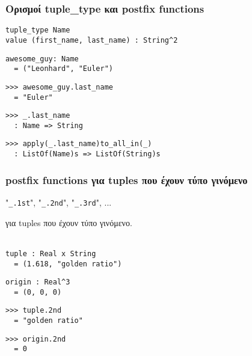 \documentclass{beamer}
\def\e{\foreignlanguage{english}}
\begin{document}
\begin{frame}[fragile]

\frametitle{Ορισμοί \e{tuple\_type} και \e{postfix functions}}

\begin{otherlanguage}{english}
\begin{verbatim}
tuple_type Name
value (first_name, last_name) : String^2
\end{verbatim}
\begin{verbatim}
awesome_guy: Name
  = ("Leonhard", "Euler")
\end{verbatim}
\pause
\begin{verbatim}
>>> awesome_guy.last_name
  = "Euler"
\end{verbatim}
\pause
\begin{verbatim}
>>> _.last_name
  : Name => String
\end{verbatim}
\pause
\begin{verbatim}
>>> apply(_.last_name)to_all_in(_)
  : ListOf(Name)s => ListOf(String)s
\end{verbatim}
\end{otherlanguage}

\end{frame}

\begin{frame}[fragile]

\frametitle{\e{postfix functions} για \e{tuples} που έχουν τύπο γινόμενο}

\begin{otherlanguage}{english}
"\verb|_.1st|", "\verb|_.2nd|", "\verb|_.3rd|", ...
\end{otherlanguage}
για \e{tuples} που έχουν τύπο γινόμενο.
\\~\

\pause
\begin{otherlanguage}{english}
\begin{verbatim}
tuple : Real x String
  = (1.618, "golden ratio")
\end{verbatim}

\begin{verbatim}
origin : Real^3
  = (0, 0, 0)
\end{verbatim}

\pause
\begin{verbatim}
>>> tuple.2nd
  = "golden ratio"
\end{verbatim}

\begin{verbatim}
>>> origin.2nd
  = 0

\end{verbatim}
\end{otherlanguage}

\end{frame}
\end{document}
